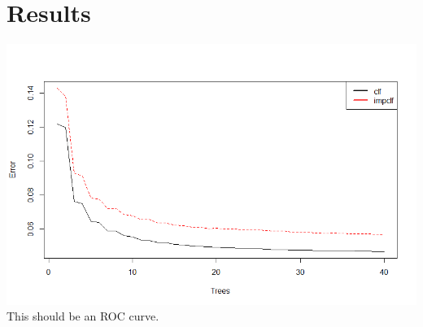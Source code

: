 \documentclass[11pt]{article}
\begin{document}
\section{Results}
\includegraphics[width=\linewidth]{images/Rplot.png}
This should be an ROC curve.
\end{document}
